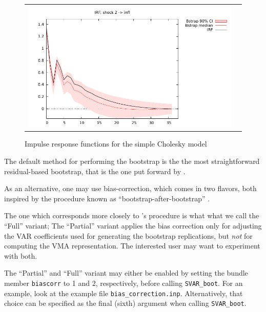 \documentclass[a4paper,10pt]{article}
\newlength{\irfw}
\newlength{\irfh}
\begin{document}
\begin{figure}[htbp]
\begin{tabular}{cc}
    \includegraphics[width=\irfw, height=\irfh]{simpleC_22}
  \end{tabular}
  \caption{Impulse response functions for the simple Cholesky model}
  \label{fig:simpleC.IRF}
\end{figure}

The default method for performing the bootstrap is the the most
straightforward residual-based bootstrap, that is the one put forward
by \cite{Runkle87}. 

As an alternative, one may use bias-correction, which comes in two
flavors, both inspired by the procedure known as
``bootstrap-after-bootstrap'' \citep{Kilian98}.

The one which corresponds more closely to \citeauthor{Kilian98}'s
procedure is what what we call the ``Full'' variant; The ``Partial''
variant applies the bias correction only for adjusting the VAR
coefficients used for generating the bootstrap replications, but
\emph{not} for computing the VMA representation. The interested user
may want to experiment with both. 

The ``Partial'' and ``Full'' variant may either be enabled by setting the
bundle member \texttt{biascorr} to 1 and 2, respectively, before
calling \texttt{SVAR\_boot}. For an example, look at the example file
\texttt{bias\_correction.inp}. Alternatively, that choice can be specified 
as the final (sixth) argument when calling \texttt{SVAR\_boot}.
\end{document}
